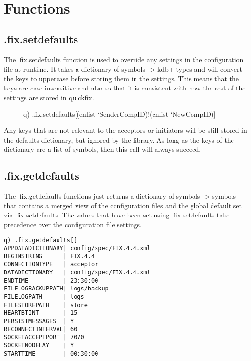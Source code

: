 \section{Functions}

\subsection{.fix.setdefaults}
\label{func:setdefaults}

The .fix.setdefaults function is used to override any settings in the configuration file at runtime. It takes
a dictionary of symbols -> kdb+ types and will convert the keys to uppercase before storing them in the settings.
This means that the keys are case insensitive and also so that it is consistent with how the rest of the settings
are stored in quickfix.

\begin{figure}[H]
\begin{qcode}
q) .fix.setdefaults[(enlist `SenderCompID)!(enlist `NewCompID)]
\end{qcode}
\end{figure}

Any keys that are not relevant to the acceptors or initiators will be still stored in
the defaults dictionary, but ignored by the library. As long as the keys of the dictionary are a list of symbols, then this call will always succeed. 

\subsection{.fix.getdefaults}
\label{func:getdefaults}

The .fix.getdefaults functions just returns a dictionary of symbols -> symbols that contains a merged view of the
configuration files and the global default set via .fix.setdefaults. The values that have been set using .fix.setdefaults
take precedence over the configuration file settings.

\begin{verbatim}
q) .fix.getdefaults[]
APPDATADICTIONARY| config/spec/FIX.4.4.xml
BEGINSTRING      | FIX.4.4
CONNECTIONTYPE   | acceptor
DATADICTIONARY   | config/spec/FIX.4.4.xml
ENDTIME          | 23:30:00
FILELOGBACKUPPATH| logs/backup
FILELOGPATH      | logs
FILESTOREPATH    | store
HEARTBTINT       | 15
PERSISTMESSAGES  | Y
RECONNECTINTERVAL| 60
SOCKETACCEPTPORT | 7070
SOCKETNODELAY    | Y
STARTTIME        | 00:30:00
\end{verbatim}

